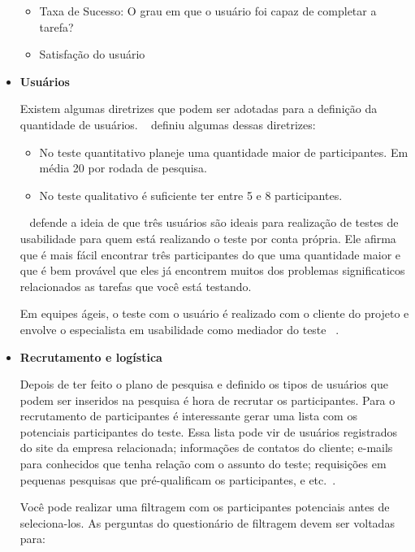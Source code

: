 \begin{itemize}
	\begin{itemize}
		\item Taxa de Sucesso: O grau em que o usuário foi capaz de completar a tarefa?
		\item Satisfação do usuário
	\end{itemize}

\item \textbf{Usuários}

Existem algumas diretrizes que podem ser adotadas para a definição da quantidade de usuários. ~ definiu algumas dessas diretrizes:

\begin{itemize}
\item No teste quantitativo planeje uma quantidade maior de participantes. Em média 20 por rodada de pesquisa.
\item No teste qualitativo é suficiente ter entre 5 e 8 participantes.
\end{itemize}

	 ~ defende a ideia de que três usuários são ideais para realização de testes de usabilidade para quem está realizando o teste por conta própria. Ele afirma que é mais fácil encontrar três participantes do que uma quantidade maior e que é bem provável que eles já encontrem muitos dos problemas significaticos relacionados as tarefas que você está testando.

	Em equipes ágeis, o teste com o usuário é realizado com o cliente do projeto e envolve o especialista em usabilidade como mediador do teste ~\cite{santos2012}.

\item \textbf{Recrutamento e logística}

Depois de ter feito o plano de pesquisa e definido os tipos de usuários que podem ser inseridos na pesquisa é hora de recrutar os participantes.
Para o recrutamento de participantes é interessante gerar uma lista com os potenciais participantes do teste. Essa lista pode vir de usuários registrados do site da empresa relacionada; informações de contatos do cliente; e-mails para conhecidos que tenha relação com o assunto do teste; requisições em pequenas pesquisas que pré-qualificam os participantes, e etc.~\cite{unger2009}.

Você pode realizar uma filtragem com os participantes potenciais antes de seleciona-los. As perguntas do questionário de filtragem devem ser voltadas para:


\end{itemize}
